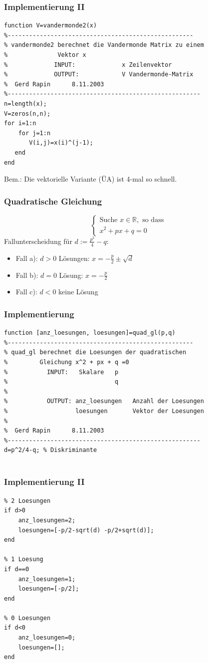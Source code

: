 \begin{frame}[fragile]\frametitle{Implementierung II}
\begin{lstlisting}
function V=vandermonde2(x)
%----------------------------------------------------
% vandermonde2 berechnet die Vandermonde Matrix zu einem
%              Vektor x
%             INPUT:             x Zeilenvektor 
%             OUTPUT:            V Vandermonde-Matrix
%  Gerd Rapin      8.11.2003
%------------------------------------------------------
n=length(x);
V=zeros(n,n);
for i=1:n
    for j=1:n
       V(i,j)=x(i)^(j-1);
   end
end
\end{lstlisting}
\alert{Bem.:} Die vektorielle Variante (\"UA) ist  4-mal  so schnell.
\end{frame}
%
%
%
\begin{frame}[fragile]\frametitle{Quadratische Gleichung}
\alert{ \[  \left\{ \begin{array}{l} \mbox{Suche }  x \in \mathbb{R},
 \mbox{ so dass } \\
 x^2+px +q =0  \end{array} \right. \]}
Fallunterscheidung für $d:=\frac{p^2}{4} -q$:
\begin{itemize}
\item  Fall a): \alert{ $d>0$}  Lösungen: $x=-\frac{p}{2} \pm \sqrt{d}$ \\
\item  Fall b): \alert{ $d=0$}  Lösung: $x=-\frac{p}{2}$\\
\item  Fall c): \alert{ $d<0$} \quad keine Lösung
\end{itemize}
\end{frame} 
%
%
%
\begin{frame}[fragile]\frametitle{Implementierung}
\begin{lstlisting}
function [anz_loesungen, loesungen]=quad_gl(p,q)
%----------------------------------------------------
% quad_gl berechnet die Loesungen der quadratischen   
%         Gleichung x^2 + px + q =0
%           INPUT:   Skalare   p
%                              q
%                 
%           OUTPUT: anz_loesungen   Anzahl der Loesungen
%                   loesungen       Vektor der Loesungen
%
%  Gerd Rapin      8.11.2003
%------------------------------------------------------
d=p^2/4-q; % Diskriminante


\end{lstlisting}
\end{frame}
%
%
%
\begin{frame}[fragile]\frametitle{Implementierung II}
\begin{lstlisting}
% 2 Loesungen
if d>0 
    anz_loesungen=2;
    loesungen=[-p/2-sqrt(d) -p/2+sqrt(d)];
end

% 1 Loesung
if d==0 
    anz_loesungen=1;
    loesungen=[-p/2];
end

% 0 Loesungen
if d<0 
    anz_loesungen=0;
    loesungen=[];
end
\end{lstlisting}
\end{frame}

